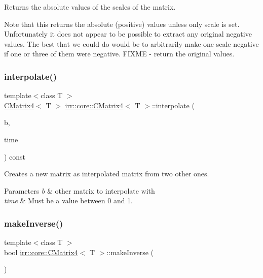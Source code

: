 Returns the absolute values of the scales of the matrix.

Note that this returns the absolute (positive) values unless only scale is set. Unfortunately it does not appear to be possible to extract any original negative values. The best that we could do would be to arbitrarily make one scale negative if one or three of them were negative. F\+I\+X\+ME -\/ return the original values. \mbox{\label{classirr_1_1core_1_1CMatrix4_a374a0f1c43c8c8ba78317c9c59590ad1}} 
\subsubsection{\texorpdfstring{interpolate()}{interpolate()}}
{\footnotesize\ttfamily template$<$class T $>$ \\
\hyperlink{classirr_1_1core_1_1CMatrix4}{C\+Matrix4}$<$ T $>$ \hyperlink{classirr_1_1core_1_1CMatrix4}{irr\+::core\+::\+C\+Matrix4}$<$ T $>$\+::interpolate (\begin{DoxyParamCaption}\item[{const \hyperlink{classirr_1_1core_1_1CMatrix4}{core\+::\+C\+Matrix4}$<$ T $>$ \&}]{b,  }\item[{\hyperlink{namespaceirr_a0277be98d67dc26ff93b1a6a1d086b07}{f32}}]{time }\end{DoxyParamCaption}) const\hspace{0.3cm}{\ttfamily [inline]}}



Creates a new matrix as interpolated matrix from two other ones. 


\begin{DoxyParams}{Parameters}
{\em b} & other matrix to interpolate with \\
\hline
{\em time} & Must be a value between 0 and 1. \\
\hline
\end{DoxyParams}
\mbox{\label{classirr_1_1core_1_1CMatrix4_a3fbface2cb6b959af64f82a5bb17540e}} 
\subsubsection{\texorpdfstring{make\+Inverse()}{makeInverse()}}
{\footnotesize\ttfamily template$<$class T $>$ \\
bool \hyperlink{classirr_1_1core_1_1CMatrix4}{irr\+::core\+::\+C\+Matrix4}$<$ T $>$\+::make\+Inverse (\begin{DoxyParamCaption}{ }\end{DoxyParamCaption})\hspace{0.3cm}{\ttfamily [inline]}}



